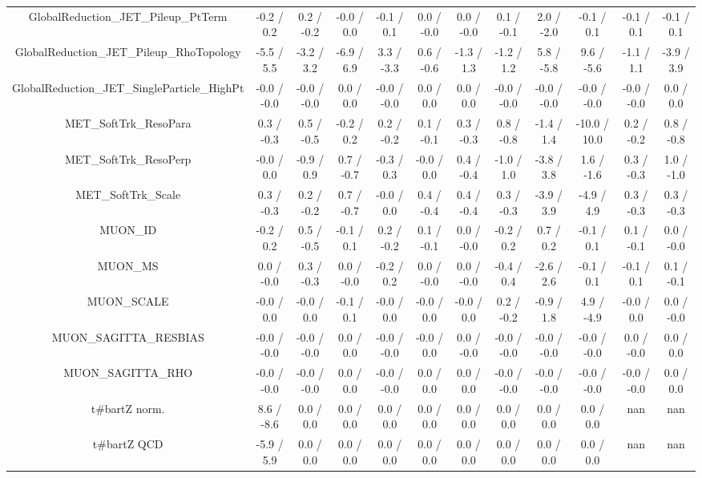 \begin{table}[htbp]
\begin{center}
\begin{tabular}{|c|c|c|c|c|c|c|c|c|c|c|c|}
  GlobalReduction_JET_Pileup_PtTerm & -0.2 / 0.2 & 0.2 / -0.2 & -0.0 / 0.0 & -0.1 / 0.1 & 0.0 / -0.0 & 0.0 / -0.0 & 0.1 / -0.1 & 2.0 / -2.0 & -0.1 / 0.1 & -0.1 / 0.1 & -0.1 / 0.1 \\ 
  GlobalReduction_JET_Pileup_RhoTopology & -5.5 / 5.5 & -3.2 / 3.2 & -6.9 / 6.9 & 3.3 / -3.3 & 0.6 / -0.6 & -1.3 / 1.3 & -1.2 / 1.2 & 5.8 / -5.8 & 9.6 / -5.6 & -1.1 / 1.1 & -3.9 / 3.9 \\ 
  GlobalReduction_JET_SingleParticle_HighPt & -0.0 / -0.0 & -0.0 / -0.0 & 0.0 / 0.0 & -0.0 / -0.0 & 0.0 / 0.0 & 0.0 / 0.0 & -0.0 / -0.0 & -0.0 / -0.0 & -0.0 / -0.0 & -0.0 / -0.0 & 0.0 / 0.0 \\ 
  MET_SoftTrk_ResoPara & 0.3 / -0.3 & 0.5 / -0.5 & -0.2 / 0.2 & 0.2 / -0.2 & 0.1 / -0.1 & 0.3 / -0.3 & 0.8 / -0.8 & -1.4 / 1.4 & -10.0 / 10.0 & 0.2 / -0.2 & 0.8 / -0.8 \\ 
  MET_SoftTrk_ResoPerp & -0.0 / 0.0 & -0.9 / 0.9 & 0.7 / -0.7 & -0.3 / 0.3 & -0.0 / 0.0 & 0.4 / -0.4 & -1.0 / 1.0 & -3.8 / 3.8 & 1.6 / -1.6 & 0.3 / -0.3 & 1.0 / -1.0 \\ 
  MET_SoftTrk_Scale & 0.3 / -0.3 & 0.2 / -0.2 & 0.7 / -0.7 & -0.0 / 0.0 & 0.4 / -0.4 & 0.4 / -0.4 & 0.3 / -0.3 & -3.9 / 3.9 & -4.9 / 4.9 & 0.3 / -0.3 & 0.3 / -0.3 \\ 
  MUON_ID & -0.2 / 0.2 & 0.5 / -0.5 & -0.1 / 0.1 & 0.2 / -0.2 & 0.1 / -0.1 & 0.0 / -0.0 & -0.2 / 0.2 & 0.7 / 0.2 & -0.1 / 0.1 & 0.1 / -0.1 & 0.0 / -0.0 \\ 
  MUON_MS & 0.0 / -0.0 & 0.3 / -0.3 & 0.0 / -0.0 & -0.2 / 0.2 & 0.0 / -0.0 & 0.0 / -0.0 & -0.4 / 0.4 & -2.6 / 2.6 & -0.1 / 0.1 & -0.1 / 0.1 & 0.1 / -0.1 \\ 
  MUON_SCALE & -0.0 / 0.0 & -0.0 / 0.0 & -0.1 / 0.1 & -0.0 / 0.0 & -0.0 / 0.0 & -0.0 / 0.0 & 0.2 / -0.2 & -0.9 / 1.8 & 4.9 / -4.9 & -0.0 / 0.0 & 0.0 / -0.0 \\ 
  MUON_SAGITTA_RESBIAS & -0.0 / -0.0 & -0.0 / -0.0 & 0.0 / 0.0 & -0.0 / -0.0 & -0.0 / 0.0 & 0.0 / -0.0 & -0.0 / -0.0 & -0.0 / -0.0 & -0.0 / -0.0 & 0.0 / -0.0 & 0.0 / 0.0 \\ 
  MUON_SAGITTA_RHO & -0.0 / -0.0 & -0.0 / -0.0 & 0.0 / 0.0 & -0.0 / -0.0 & 0.0 / 0.0 & 0.0 / 0.0 & -0.0 / -0.0 & -0.0 / -0.0 & -0.0 / -0.0 & -0.0 / -0.0 & 0.0 / 0.0 \\ 
  t#bar{t}Z norm. & 8.6 / -8.6 & 0.0 / 0.0 & 0.0 / 0.0 & 0.0 / 0.0 & 0.0 / 0.0 & 0.0 / 0.0 & 0.0 / 0.0 & 0.0 / 0.0 & 0.0 / 0.0 &    nan    &    nan    \\ 
  t#bar{t}Z QCD & -5.9 / 5.9 & 0.0 / 0.0 & 0.0 / 0.0 & 0.0 / 0.0 & 0.0 / 0.0 & 0.0 / 0.0 & 0.0 / 0.0 & 0.0 / 0.0 & 0.0 / 0.0 &    nan    &    nan    \\ 

\end{tabular}
\end{center}
\end{table}
